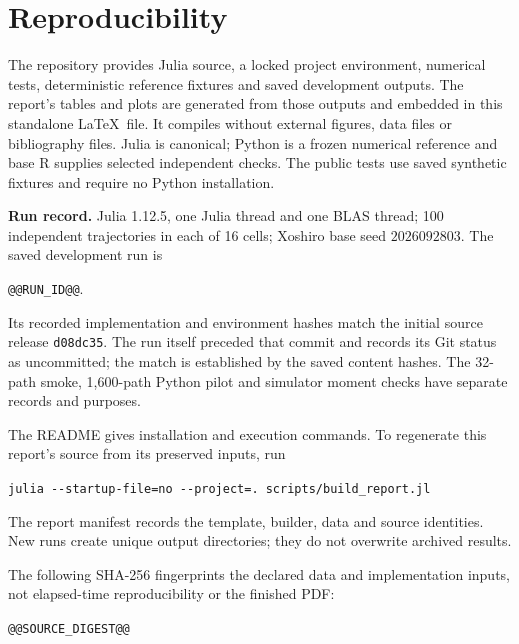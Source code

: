 \documentclass[11pt]{article}
\begin{document}
\section{Reproducibility}
The repository provides Julia source, a locked project environment, numerical
tests, deterministic reference fixtures and saved development outputs. The report's
tables and plots are generated from those outputs and embedded in this standalone
\LaTeX\ file. It compiles without external figures, data files or bibliography
files. Julia is canonical; Python is a frozen numerical reference and base R
supplies selected independent checks. The public tests use saved synthetic
fixtures and require no Python installation.

\textbf{Run record.} Julia 1.12.5, one Julia thread and one BLAS thread;
100 independent trajectories in each of 16 cells; Xoshiro base seed $2026092803$.
The saved development run is
\begin{center}\small\texttt{@@RUN_ID@@}.\end{center}
Its recorded implementation and environment hashes match the initial source
release \texttt{d08dc35}. The run itself preceded that commit and records its
Git status as uncommitted; the match is established by the saved content hashes.
The 32-path smoke, 1,600-path Python pilot and simulator moment checks have
separate records and purposes.

The README gives installation and execution commands. To regenerate this report's
source from its preserved inputs, run
\begin{center}\small\verb|julia --startup-file=no --project=. scripts/build_report.jl|\end{center}
The report manifest records the template, builder, data and source identities.
New runs create unique output directories; they do not overwrite archived results.
\begin{samepage}
The following SHA-256 fingerprints the declared data and implementation inputs,
not elapsed-time reproducibility or the finished PDF:
\begin{center}\footnotesize\texttt{@@SOURCE_DIGEST@@}\end{center}
\end{samepage}
\end{document}
